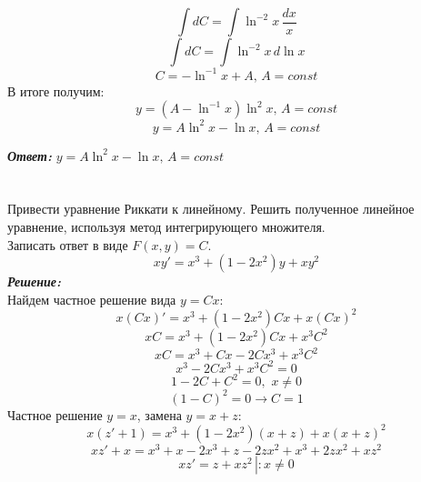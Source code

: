 \documentclass[a5paper, 10pt]{article}
\theoremstyle{definition}
\theoremstyle{plain}
\theoremstyle{remark}
\begin{document}
\begin{equation*}
\int dC  = \int \ln ^{-2} x  \,\frac{dx}{x} 
\end{equation*}
\begin{equation*}
\int dC  = \int \ln ^{-2} x \, d \ln x
\end{equation*}
\begin{equation*}
C  =  - \ln ^{-1} x + A, \, A = const
\end{equation*}
В итоге получим:
\begin{equation*}
  y = (A - \ln ^{-1} x  )  \ln ^2 x, \, A = const
\end{equation*}
\begin{equation*}
  y = A\ln ^2 x - \ln x , \, A = const
\end{equation*}

\textit{\textbf{Ответ:}} $  y = A\ln ^2 x - \ln x , \, A = const$

\newpage
\section{}
Привести уравнение Риккати к линейному. Решить полученное линейное уравнение, используя метод интегрирующего множителя.\\
Записать ответ в виде $F(x, y) = C$.
\begin{equation*}
xy' = x^3 + (1 - 2x^2)y + xy^2
\end{equation*}
\textit{\textbf{Решение:}}\\
Найдем частное решение вида $y = Cx$:
\begin{equation*}
x \left(  Cx \right)' = x^3 + (1 - 2x^2) Cx + x\left(  Cx \right)^2
\end{equation*}
\begin{equation*}
x C = x^3 + (1 - 2x^2) Cx + x^3C^2
\end{equation*}
\begin{equation*}
x C = x^3 + Cx - 2Cx^3 + x^3C^2
\end{equation*}
\begin{equation*}
x^3 - 2Cx^3 + x^3C^2 = 0
\end{equation*}
\begin{equation*}
1 - 2C + C^2 = 0,  \, \, x \neq 0
\end{equation*}
\begin{equation*}
\left(1 - C \right)^2 = 0 \to C = 1
\end{equation*}
Частное решение  $y = x$, замена $y = x + z$:
\begin{equation*}
x(z' + 1) = x^3 + (1 - 2x^2)(x + z) + x(x + z)^2
\end{equation*}
\begin{equation*}
xz' + x = x^3 + x - 2x^3 + z - 2zx^2 + x^3 +2zx^2 +x z^2
\end{equation*}
\begin{equation*}
xz'  =  z +x z^2 \, \left| \right. : x \neq 0
\end{equation*}
\end{document}

